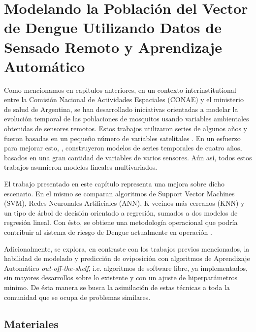%
%

\justifying
\chapter{Modelando la Población del Vector de Dengue Utilizando Datos de Sensado Remoto y Aprendizaje Automático}

  \par Como mencionamos en capitulos anteriores, en un contexto interinstitutional entre
    la Comisión Nacional de Actividades Espaciales (CONAE) y el ministerio de salud
    de Argentina, se han desarrollado iniciativas orientadas a modelar la evolución temporal de
    las poblaciones de mosquitos usando variables ambientales obtenidas de
    sensores remotos. Estos trabajos utilizaron series de algunos años y fueron
    basadas en un pequeño número de variables satelitales \cite{ndwi_erffectiveness, modis_data}.
    En un esfuerzo para mejorar esto, \cite{temporal_modeling}, construyeron modelos
    de series temporales de cuatro años, basados en una gran cantidad de variables
    de varios sensores.
    Aún así, todos estos trabajos asumieron modelos lineales multivariados.

  \par El trabajo presentado en este capítulo representa una mejora sobre
    dicho escenario. En el mismo se comparan algoritmos de
    Support Vector Machines (SVM), Redes Neuronales Artificiales (ANN),
    K-vecinos más cercanos (KNN) y un tipo de árbol de decisión orientado a
    regresión, sumados a dos modelos de regresión lineal. Con ésto, se
    obtiene una metodología operacional que podría contribuir al sistema de riesgo
    de Dengue actualmente en operación \cite{porcasi_operative, analisis_cordoba}.

  \par Adicionalmente, se explora, en contraste con los trabajos previos mencionados,
    la habilidad de modelado y predicción de oviposición con algoritmos de Aprendizaje
    Automático \textit{out-off-the-shelf}, i.e. algoritmos de software libre, ya
    implementados, sin mayores desarrollos sobre lo existente y con un ajuste de
    hiperparámetros minimo. De ésta manera se busca la asimilación de estas
    técnicas a toda la comunidad que se ocupa de problemas similares.


\section{Materiales}

